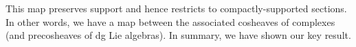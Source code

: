 This map preserves support and hence restricts to compactly-supported sections.
In other words, we have a map between the associated cosheaves of complexes (and precosheaves of dg Lie algebras).
In summary, we have shown our key result.
%
%
%
%
%

